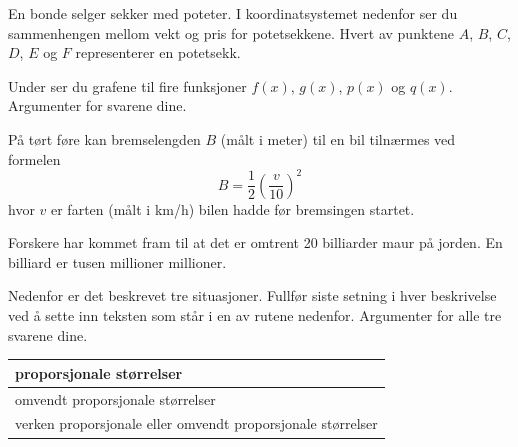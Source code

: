 En bonde selger sekker med poteter. I koordinatsystemet nedenfor ser du sammenhengen mellom vekt og pris for
potetsekkene. Hvert av punktene $A$, $B$, $C$, $D$, $E$ og $F$ representerer en potetsekk.

Under ser du grafene til fire funksjoner $f(x)$, $g(x)$, $p(x)$ og $q(x)$.
Argumenter for svarene dine.

På tørt føre kan bremselengden $B$ (målt i meter) til en bil tilnærmes ved formelen
\[ B=\frac{1}{2}\left(\frac{v}{10}\right)^2\]
hvor $v$ er farten (målt i km/h) bilen hadde før bremsingen startet.

Forskere har kommet fram til at det er omtrent 20 billiarder maur på jorden.
En billiard er tusen millioner millioner.

Nedenfor er det beskrevet tre situasjoner. Fullfør siste setning i hver beskrivelse ved
å sette inn teksten som står i en av rutene nedenfor. Argumenter for alle tre svarene dine.
\begin{center}
\begin{tabular}{|l|}
	\hline
	proporsjonale
	størrelser \\ \hline
	omvendt
	proporsjonale
	størrelser \\ \hline 
	verken proporsjonale
	eller omvendt
	proporsjonale
	størrelser \\ 
	\hline
\end{tabular}
\end{center} \vsk

